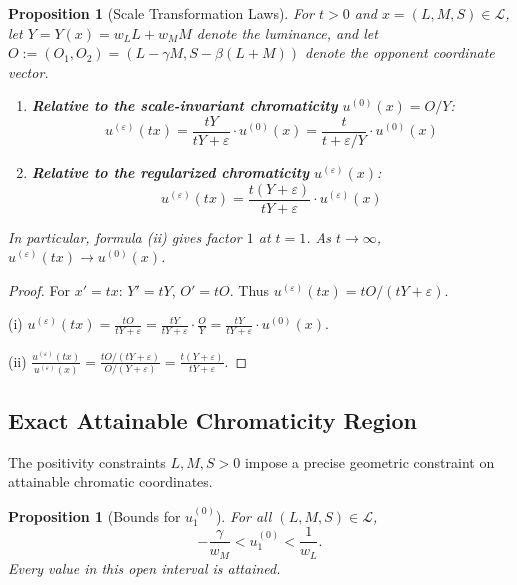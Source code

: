 \documentclass[11pt]{article}
\theoremstyle{plain}
\newtheorem{proposition}[theorem]{Proposition}
\theoremstyle{definition}
\theoremstyle{remark}
\begin{document}
\begin{proposition}[Scale Transformation Laws]
\label{prop:scale-invariance}
For $t > 0$ and $x = (L, M, S) \in \mathcal{L}$, let $Y = Y(x) = w_L L + w_M M$ denote the luminance, and let $O := (O_1, O_2) = (L - \gamma M, S - \beta(L+M))$ denote the opponent coordinate vector.
\begin{enumerate}[label=(\roman*)]
    \item \textbf{Relative to the scale-invariant chromaticity} $u^{(0)}(x) = O/Y$:
    \begin{equation}
    \boxed{
    u^{(\varepsilon)}(tx) = \frac{tY}{tY + \varepsilon} \cdot u^{(0)}(x) = \frac{t}{t + \varepsilon/Y} \cdot u^{(0)}(x)
    }
    \end{equation}
    \item \textbf{Relative to the regularized chromaticity} $u^{(\varepsilon)}(x)$:
    \begin{equation}
    \boxed{
    u^{(\varepsilon)}(tx) = \frac{t(Y + \varepsilon)}{tY + \varepsilon} \cdot u^{(\varepsilon)}(x)
    }
    \end{equation}
\end{enumerate}
In particular, formula (ii) gives factor $1$ at $t = 1$. As $t \to \infty$, $u^{(\varepsilon)}(tx) \to u^{(0)}(x)$.
\end{proposition}

\begin{proof}
For $x' = tx$: $Y' = tY$, $O' = tO$. Thus $u^{(\varepsilon)}(tx) = tO/(tY + \varepsilon)$.

(i) $u^{(\varepsilon)}(tx) = \frac{tO}{tY + \varepsilon} = \frac{tY}{tY + \varepsilon} \cdot \frac{O}{Y} = \frac{tY}{tY + \varepsilon} \cdot u^{(0)}(x)$.

(ii) $\frac{u^{(\varepsilon)}(tx)}{u^{(\varepsilon)}(x)} = \frac{tO/(tY + \varepsilon)}{O/(Y + \varepsilon)} = \frac{t(Y + \varepsilon)}{tY + \varepsilon}$.
\end{proof}

\subsection{Exact Attainable Chromaticity Region}

The positivity constraints $L, M, S > 0$ impose a precise geometric constraint on attainable chromatic coordinates.

\begin{proposition}[Bounds for $u_1^{(0)}$]
\label{prop:u1-bounds}
For all $(L, M, S) \in \mathcal{L}$,
\begin{equation}
-\frac{\gamma}{w_M} < u_1^{(0)} < \frac{1}{w_L}.
\end{equation}
Every value in this open interval is attained.
\end{proposition}
\end{document}
